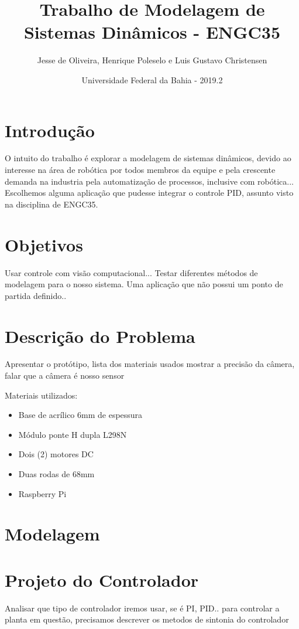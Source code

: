 \documentclass{article}
\title{Trabalho de Modelagem de Sistemas Dinâmicos - ENGC35}
\author{Jesse de Oliveira, Henrique Poleselo e Luis Gustavo Christensen}
\date{Universidade Federal da Bahia - 2019.2}
\begin{document}
\maketitle

\section{Introdução}
O intuito do trabalho é explorar a modelagem de sistemas dinâmicos, devido ao interesse na área de robótica por todos membros da equipe e pela crescente demanda na industria pela automatização de processos, inclusive com robótica...
Escolhemos alguma aplicação que pudesse integrar o controle PID, assunto visto na disciplina de ENGC35.

\section{Objetivos}
Usar controle com visão computacional... Testar diferentes métodos de modelagem para o nosso sistema. Uma aplicação que não possui um ponto de partida definido..

\section{Descrição do Problema}
Apresentar o protótipo, lista dos materiais usados
mostrar a precisão da câmera, falar que a câmera é nosso sensor

Materiais utilizados:
\begin{itemize}
  \item Base de acrílico 6mm de espessura
  \item Módulo ponte H dupla L298N
  \item Dois (2) motores DC
  \item Duas rodas de 68mm
  \item Raspberry Pi
  \
\end{itemize}


\section{Modelagem}

\section{Projeto do Controlador}
Analisar que tipo de controlador iremos usar, se é PI, PID.. para controlar a planta em questão, precisamos descrever os metodos de sintonia do controlador
\end{document}
